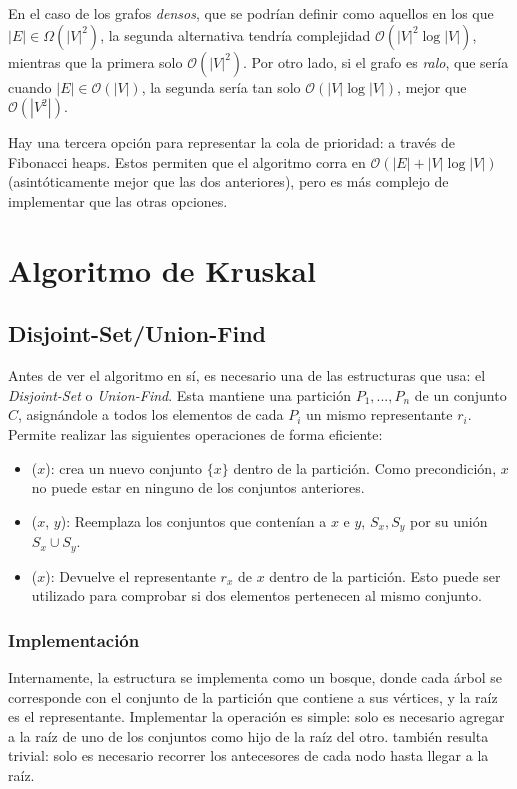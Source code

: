 \documentclass[a4paper]{report}
\newcommand{\BigO}[1]{\ensuremath{\mathcal{O}(#1)}}
\newcommand{\BigOmega}[1]{\ensuremath{\Omega(#1)}}
\begin{document}
En el caso de los grafos \textit{densos}, que se podrían definir como aquellos en los que $|E| \in \BigOmega{|V|^2}$, la segunda alternativa tendría complejidad \BigO{|V|^2\log{|V|}}, mientras que la primera solo \BigO{|V|^2}. Por otro lado, si el grafo es \textit{ralo}, que sería cuando $|E| \in \BigO{|V|}$, la segunda sería tan solo \BigO{|V|\log{|V|}}, mejor que \BigO{|V^2|}.

Hay una tercera opción para representar la cola de prioridad: a través de Fibonacci heaps. Estos permiten que el algoritmo corra en \BigO{|E| + |V|\log{|V|}} (asintóticamente mejor que las dos anteriores), pero es más complejo de implementar que las otras opciones.

\section{Algoritmo de Kruskal}

\subsection{Disjoint-Set/Union-Find}

Antes de ver el algoritmo en sí, es necesario una de las estructuras que usa: el \textit{Disjoint-Set} o \textit{Union-Find}. Esta mantiene una partición $P_1, ..., P_n$ de un conjunto $C$, asignándole a todos los elementos de cada $P_i$ un mismo representante $r_i$. Permite realizar las siguientes operaciones de forma eficiente:
\begin{itemize}
    \item {}($x$): crea un nuevo conjunto $\{x\}$ dentro de la partición. Como precondición, $x$ no puede estar en ninguno de los conjuntos anteriores.
    \item {}($x$, $y$): Reemplaza los conjuntos que contenían a $x$ e $y$, $S_x, S_y$ por su unión $S_x \cup S_y$.
    \item {}($x$): Devuelve el representante $r_x$ de $x$ dentro de la partición. Esto puede ser utilizado para comprobar si dos elementos pertenecen al mismo conjunto.
\end{itemize}

\subsubsection{Implementación}

Internamente, la estructura se implementa como un bosque, donde cada árbol se corresponde con el conjunto de la partición que contiene a sus vértices, y la raíz es el representante. Implementar la operación  es simple: solo es necesario agregar a la raíz de uno de los conjuntos como hijo de la raíz del otro.  también resulta trivial: solo es necesario recorrer los antecesores de cada nodo hasta llegar a la raíz.
\end{document}
